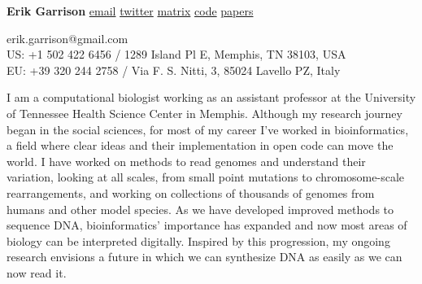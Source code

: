 \documentclass[11pt,hidelinks,letterpaper]{article}
\begin{document}
\begin{flushleft}
{\huge
  \textbf{Erik Garrison}
}
\vspace*{0.05in}
\newline
{\large
      \href{mailto:erik.garrison@gmail.com}{email}
      \href{https://twitter.com/erikgarrison}{twitter}
      \href{https://matrix.to/#/@erikgarrison:matrix.org}{matrix}
      \href{https://github.com/ekg}{code}
      \href{https://scholar.google.com/citations?user=d5TKoncAAAAJ&hl=en}{papers}
}

{\small
  erik.garrison@gmail.com \\
  US: +1 502 422 6456 /
  1289 Island Pl E, Memphis, TN 38103, USA \\
  EU: +39 320 244 2758 /
  Via F. S. Nitti, 3, 85024 Lavello PZ, Italy
}
\end{flushleft}

\begin{comment}
{\it \large
  Pangenomicist with a quantitative social science background.
  Harvard undergrad, Cambridge PhD.
  Learned in the ways of free culture.
  Sharing in the powers of free software.
  Lover of commonwealths.
  Born in Kentucky, matured in Massachusetts, honed in England.
  Lives in Tennessee and Italy, travelling the world, both physically and virtually.
}
\end{comment}


{\large
  I am a computational biologist working as an assistant professor at the University of Tennessee Health Science Center in Memphis.
  Although my research journey began in the social sciences, for most of my career I've worked in bioinformatics, a field where clear ideas and their implementation in open code can move the world.
  I have worked on methods to read genomes and understand their variation, looking at all scales, from small point mutations to chromosome-scale rearrangements, and working on collections of thousands of genomes from humans and other model species.
  As we have developed improved methods to sequence DNA, bioinformatics' importance has expanded and now most areas of biology can be interpreted digitally.
  Inspired by this progression, my ongoing research envisions a future in which we can synthesize DNA as easily as we can now read it.
}
\end{document}
